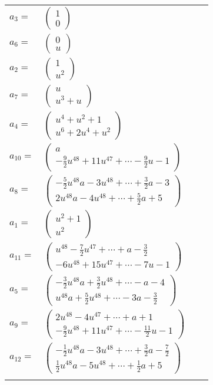 \documentclass[1p]{elsarticle_modified}
\theoremstyle{definition}
\begin{document}
\begin{tabular}{m{7pt} m{180pt} m{7pt} m{180pt} }
\flushright $a_{3}=$&$\begin{pmatrix}1\\0\end{pmatrix}$ \\
\flushright $a_{6}=$&$\begin{pmatrix}0\\u\end{pmatrix}$ \\
\flushright $a_{2}=$&$\begin{pmatrix}1\\u^2\end{pmatrix}$ \\
\flushright $a_{7}=$&$\begin{pmatrix}u\\u^3+u\end{pmatrix}$ \\
\flushright $a_{4}=$&$\begin{pmatrix}u^4+u^2+1\\u^6+2 u^4+u^2\end{pmatrix}$ \\
\flushright $a_{10}=$&$\begin{pmatrix}a\\-\frac{9}{2} u^{48}+11 u^{47}+\cdots-\frac{9}{2} u-1\end{pmatrix}$ \\
\flushright $a_{8}=$&$\begin{pmatrix}-\frac{5}{2} u^{48} a-3 u^{48}+\cdots+\frac{3}{2} a-3\\2 u^{48} a-4 u^{48}+\cdots+\frac{5}{2} a+5\end{pmatrix}$ \\
\flushright $a_{1}=$&$\begin{pmatrix}u^2+1\\u^2\end{pmatrix}$ \\
\flushright $a_{11}=$&$\begin{pmatrix}u^{48}-\frac{7}{2} u^{47}+\cdots+a-\frac{3}{2}\\-6 u^{48}+15 u^{47}+\cdots-7 u-1\end{pmatrix}$ \\
\flushright $a_{5}=$&$\begin{pmatrix}-\frac{3}{2} u^{48} a+\frac{3}{2} u^{48}+\cdots- a-4\\u^{48} a+\frac{5}{2} u^{48}+\cdots-3 a-\frac{3}{2}\end{pmatrix}$ \\
\flushright $a_{9}=$&$\begin{pmatrix}2 u^{48}-4 u^{47}+\cdots+a+1\\-\frac{9}{2} u^{48}+11 u^{47}+\cdots-\frac{11}{2} u-1\end{pmatrix}$ \\
\flushright $a_{12}=$&$\begin{pmatrix}-\frac{1}{2} u^{48} a-3 u^{48}+\cdots+\frac{3}{2} a-\frac{7}{2}\\\frac{1}{2} u^{48} a-5 u^{48}+\cdots+\frac{1}{2} a+5\end{pmatrix}$\\&\end{tabular}
\end{document}
